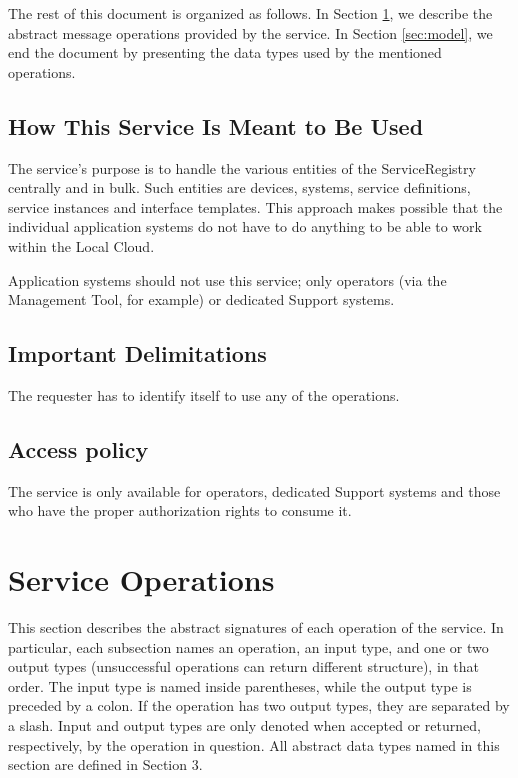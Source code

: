 \documentclass[a4paper]{arrowhead}
\begin{document}
The rest of this document is organized as follows.
In Section \ref{sec:functions}, we describe the abstract message operations provided by the service.
In Section \ref{sec:model}, we end the document by presenting the data types used by the mentioned operations.

\subsection{How This Service Is Meant to Be Used}
The service's purpose is to handle the various entities of the ServiceRegistry centrally and in bulk. Such entities are devices, systems, service definitions, service instances and interface templates. This approach makes possible that the individual application systems do not have to do anything to be able to work within the Local Cloud.

Application systems should not use this service; only operators (via the Management Tool, for example) or dedicated Support systems.

\subsection{Important Delimitations}
\label{sec:delimitations}

The requester has to identify itself to use any of the operations.

\subsection{Access policy}
\label{sec:accesspolicy}

The service is only available for operators, dedicated Support systems and those who have the proper authorization rights to consume it.

\newpage

\section{Service Operations}
\label{sec:functions}

This section describes the abstract signatures of each operation of the service. 
In particular, each subsection names an operation, an input type, and one or two output types (unsuccessful operations can return different structure), in that order.
The input type is named inside parentheses, while the output type is preceded by a colon. If the operation has two output types, they are separated by a slash.
Input and output types are only denoted when accepted or returned, respectively, by the operation in question. All abstract data types named in this section are defined in Section 3.
\end{document}
